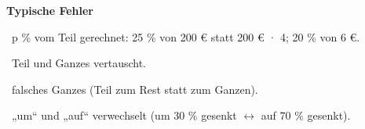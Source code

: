 \documentclass[11pt]{article}
\begin{document}
\pfheftstil
\fancyfoot[C]{\parbox[t]{\textwidth}{\mbfhbox\par\vspace{1.5mm}{\footnotesize\color{mbgrau}{\scriptsize Z8W}\hfill\thepage}}}
{\small\noindent\textbf{Typische Fehler}\par\smallskip\noindent \textbullet\ p \% vom Teil gerechnet: 25 \% von 200 € statt 200 € · 4; 20 \% von 6 €.\par\noindent \textbullet\ Teil und Ganzes vertauscht.\par\noindent \textbullet\ falsches Ganzes (Teil zum Rest statt zum Ganzen).\par\noindent \textbullet\ „um“ und „auf“ verwechselt (um 30 \% gesenkt $\leftrightarrow$ auf 70 \% gesenkt).\par}\medskip
\begin{pfloesung}{}
\end{pfloesung}
\begin{pfloesung}{}
\end{pfloesung}
\begin{pfloesung}{}
\end{pfloesung}
\begin{pfloesung}{}
\end{pfloesung}
\begin{pfloesung}{}
\end{pfloesung}
\begin{pfloesung}{}
\end{pfloesung}
\begin{pfloesung}{}
\end{pfloesung}
\begin{pfloesung}{}
\end{pfloesung}
\begin{pfloesung}{}
\end{pfloesung}
\begin{pfloesung}{}
\end{pfloesung}
\end{document}
